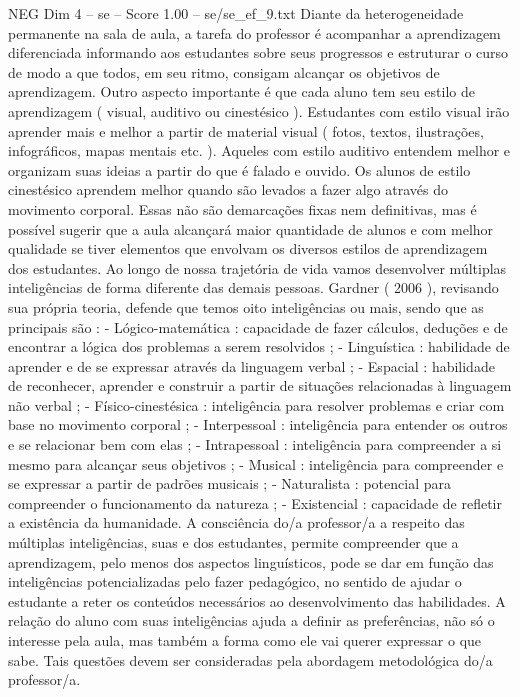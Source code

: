 \begin{textsample}{NEG Dim 4 – se – Score 1.00 – se/se\_ef\_9.txt}
Diante da heterogeneidade permanente na sala de aula, a tarefa do professor é acompanhar a aprendizagem diferenciada informando aos estudantes sobre seus progressos e estruturar o curso de modo a que todos, em seu ritmo, consigam alcançar os objetivos de aprendizagem.
Outro aspecto importante é que cada aluno tem seu estilo de aprendizagem ( visual, auditivo ou cinestésico ).
Estudantes com estilo visual irão aprender mais e melhor a partir de material visual ( fotos, textos, ilustrações, infográficos, mapas mentais etc. ).
Aqueles com estilo auditivo entendem melhor e organizam suas ideias a partir do que é falado e ouvido.
Os alunos de estilo cinestésico aprendem melhor quando são levados a fazer algo através do movimento corporal.
Essas não são demarcações fixas nem definitivas, mas é possível sugerir que a aula alcançará maior quantidade de alunos e com melhor qualidade se tiver elementos que envolvam os diversos estilos de aprendizagem dos estudantes.
Ao longo de nossa trajetória de vida vamos desenvolver múltiplas inteligências de forma diferente das demais pessoas.
Gardner ( 2006 ), revisando sua própria teoria, defende que temos oito inteligências ou mais, sendo que as principais são : - Lógico-matemática : capacidade de fazer cálculos, deduções e de encontrar a lógica dos problemas a serem resolvidos ; - Linguística : habilidade de aprender e de se expressar através da linguagem verbal ; - Espacial : habilidade de reconhecer, aprender e construir a partir de situações relacionadas à linguagem não verbal ; - Físico-cinestésica : inteligência para resolver problemas e criar com base no movimento corporal ; - Interpessoal : inteligência para entender os outros e se relacionar bem com elas ; - Intrapessoal : inteligência para compreender a si mesmo para alcançar seus objetivos ; - Musical : inteligência para compreender e se expressar a partir de padrões musicais ; - Naturalista : potencial para compreender o funcionamento da natureza ; - Existencial : capacidade de refletir a existência da humanidade.
A consciência do/a professor/a a respeito das múltiplas inteligências, suas e dos estudantes, permite compreender que a aprendizagem, pelo menos dos aspectos linguísticos, pode se dar em função das inteligências potencializadas pelo fazer pedagógico, no sentido de ajudar o estudante a reter os conteúdos necessários ao desenvolvimento das habilidades.
A relação do aluno com suas inteligências ajuda a definir as preferências, não só o interesse pela aula, mas também a forma como ele vai querer expressar o que sabe.
Tais questões devem ser consideradas pela abordagem metodológica do/a professor/a.

\end{textsample}
